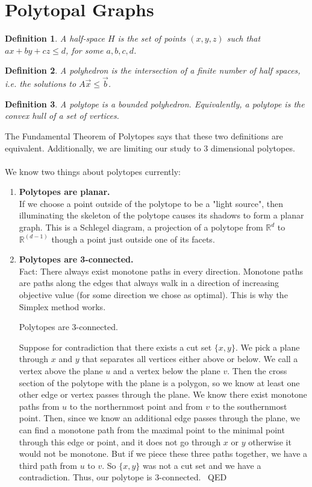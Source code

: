 \documentclass{article}
\newtheorem{definition}{Definition}
\newenvironment{proof}{{\sc Proof:}}{~\hfill QED}
\begin{document}
\section{Polytopal Graphs}
\begin{definition}
A half-space $H$  is the set of points $(x,y,z)$  such that $ax+by+cz\leq d$, for some $a, b, c, d$.
\end{definition}
\begin{definition}
A polyhedron is the intersection of a finite number of half spaces, i.e. the solutions to $A\vec{x}\leq \vec{b}$.
\end{definition}
\begin{definition}
A polytope is a bounded polyhedron. Equivalently, a polytope is the convex hull of a set of vertices.
\end{definition}
The Fundamental Theorem of Polytopes says that these two definitions are equivalent. Additionally, we are limiting our study to 3 dimensional polytopes. \\\\
We know two things about polytopes currently:
\begin{enumerate}
    \item \textbf{Polytopes are planar.}\\
        If we choose a point outside of the polytope to be a "light source", then illuminating the skeleton of the polytope causes its shadows to form a planar graph. This is a Schlegel diagram, a projection of a polytope from $\mathbb{R}^d$ to $\mathbb{R}^{(d-1)}$ though a point just outside one of its facets. 
    \item \textbf{Polytopes are 3-connected.} \\
    Fact: There always exist monotone paths in every direction. Monotone paths are paths along the edges that always walk in a direction of increasing objective value (for some direction we chose as optimal). This is why the Simplex method works.
    \begin{theorem}
    Polytopes are 3-connected.
    \end{theorem}
    \begin{proof}
    Suppose for contradiction that there exists a cut set $\{x,y\}$. We pick a plane through $x$ and $y$ that separates all vertices either above or below. We call a vertex above the plane $u$ and a vertex below the plane $v$. Then the cross section of the polytope with the plane is a polygon, so we know at least one other edge or vertex passes through the plane. We know there exist monotone paths from $u$ to the northernmost point and from $v$ to the southernmost point. Then, since we know an additional edge passes through the plane, we can find a monotone path from the maximal point to the minimal point through this edge or point, and it does not go through $x$ or $y$ otherwise  it would not be monotone. But if we piece these three paths together, we have a third path from $u$ to $v$. So $\{x, y\}$ was not a cut set and we have a contradiction. Thus, our polytope is 3-connected.
    \end{proof}
\end{enumerate}
\end{document}
